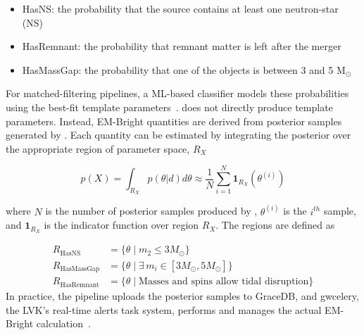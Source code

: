 \begin{refsection}
\begin{itemize}
    \item HasNS: the probability that the source contains at least one neutron-star (NS)
    \item HasRemnant: the probability that remnant matter is left after the merger 
    \item HasMassGap: the probability that one of the objects is between 3 and 5 $\mathrm{M}_{\odot}$
\end{itemize}

For matched-filtering pipelines, a ML-based classifier models these probabilities using the best-fit template parameters~\cite{Chatterjee:2019avs}. 
\aframe does not directly produce template parameters. 
Instead, EM-Bright quantities are derived from posterior samples generated by \amplfi. 
Each quantity can be estimated by integrating the posterior over the appropriate region of parameter space, $R_X$

\begin{equation}
    p(X) = \int_{R_X} p(\theta |d) d\theta \approx \frac{1}{N}\sum_{i=1}^{N}\mathbf{1}_{R_X}(\theta^{(i)})
\end{equation}

\noindent where $N$ is the number of posterior samples produced by \amplfi, $\theta^{(i)}$ is the $i^{th}$ sample, and $\mathbf{1}_{R_X}$ is the indicator function over region $R_X$. The regions are defined as

\begin{align}
    R_{\mathrm{HasNS}} &= \{ \theta \mid m_2 \leq 3M_{\odot} \} \\
    R_{\mathrm{HasMassGap}} &= \{ \theta \mid \exists \, m_i \in [3M_{\odot}, 5M_{\odot}] \} \\
    R_{\mathrm{HasRemnant}} &= \{ \theta \mid \text{Masses and spins allow tidal disruption} \}
\end{align}
In practice, the pipeline uploads the posterior samples to GraceDB, and gwcelery, the LVK's real-time alerts task system, performs and manages the actual EM-Bright calculation~\cite{Chaudhary_2024, Magee_2021}.


\end{refsection}
